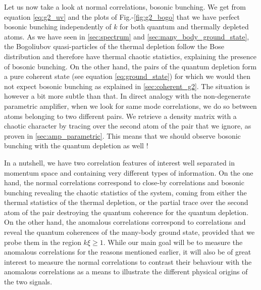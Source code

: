 Let us now take a look at normal correlations, \ie bosonic bunching. We get from equation \ref{eq:g2_uv} and the plots of Fig.-\ref{fig:g2_bogo} that we have perfect bosonic bunching independently of $k$ for both quantum and thermally depleted atoms. As we have seen in \ref{sec:spectrum} and \ref{sec:many_body_ground_state}, the Bogoliubov quasi-particles of the thermal depletion follow the Bose distribution and therefore have thermal chaotic statistics, explaining the presence of bosonic bunching. On the other hand, the \kmk pairs of the quantum depletion form a pure coherent state (see equation \ref{eq:ground_state}) for which we would then not expect bosonic bunching as explained in \ref{sec:coherent_g2}. The situation is however a bit more subtle than that. In direct analogy with the non-degenerate parametric amplifier, when we look for same mode \kk correlations, we do so between atoms belonging to two different pairs. We retrieve a density matrix with a chaotic character \cite{yurke1987} by tracing over the second atom of the pair that we ignore, as proven in \ref{sec:amp_parametric}. This means that we should observe bosonic bunching with the quantum depletion as well \cite{butera2020}!


In a nutshell, we have two correlation features of interest well separated in momentum space and containing very different types of information. On the one hand, the normal correlations correspond to close-by correlations and bosonic bunching revealing the chaotic statistics of the system, coming from either the thermal statistics of the thermal depletion, or the partial trace over the second atom of the pair destroying the quantum coherence for the quantum depletion. On the other hand, the anomalous correlations correspond to \kmk correlations and reveal the quantum coherences of the many-body ground state, provided that we probe them in the region $k \xi \geq 1$. While our main goal will be to measure the anomalous \kmk correlations for the reasons mentioned earlier, it will also be of great interest to measure the normal correlations to contrast their behaviour with the anomalous correlations as a means to illustrate the different physical origins of the two signals. 


